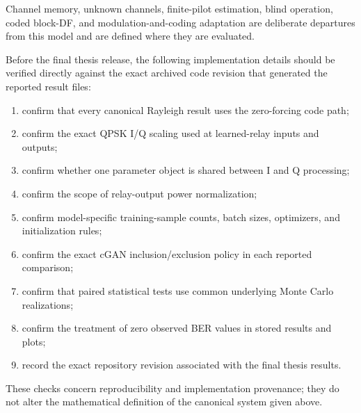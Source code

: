 Channel memory, unknown channels, finite-pilot estimation, blind
operation, coded block-DF, and modulation-and-coding adaptation are
deliberate departures from this model and are defined where they are
evaluated.

Before the final thesis release, the following implementation details
should be verified directly against the exact archived code revision
that generated the reported result files:

\begin{enumerate}
    \item confirm that every canonical Rayleigh result uses the
          zero-forcing code path;
    \item confirm the exact QPSK I/Q scaling used at learned-relay
          inputs and outputs;
    \item confirm whether one parameter object is shared between I and
          Q processing;
    \item confirm the scope of relay-output power normalization;
    \item confirm model-specific training-sample counts, batch sizes,
          optimizers, and initialization rules;
    \item confirm the exact cGAN inclusion/exclusion policy in each
          reported comparison;
    \item confirm that paired statistical tests use common underlying
          Monte Carlo realizations;
    \item confirm the treatment of zero observed BER values in stored
          results and plots;
    \item record the exact repository revision associated with the
          final thesis results.
\end{enumerate}

These checks concern reproducibility and implementation provenance;
they do not alter the mathematical definition of the canonical system
given above.